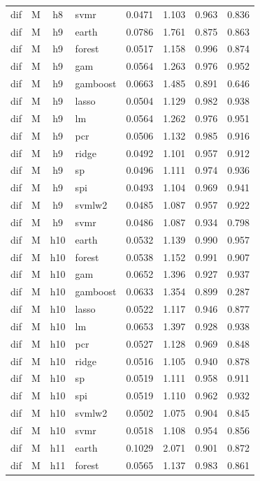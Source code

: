 \begin{ThreePartTable}
\begin{longtable}[t]{llclcccc}
dif & M & h8 & svmr & 0.0471 & 1.103 & 0.963 & 0.836\\
\addlinespace
dif & M & h9 & earth & 0.0786 & 1.761 & 0.875 & 0.863\\
dif & M & h9 & forest & 0.0517 & 1.158 & 0.996 & 0.874\\
dif & M & h9 & gam & 0.0564 & 1.263 & 0.976 & 0.952\\
dif & M & h9 & gamboost & 0.0663 & 1.485 & 0.891 & 0.646\\
dif & M & h9 & lasso & 0.0504 & 1.129 & 0.982 & 0.938\\
dif & M & h9 & lm & 0.0564 & 1.262 & 0.976 & 0.951\\
dif & M & h9 & pcr & 0.0506 & 1.132 & 0.985 & 0.916\\
dif & M & h9 & ridge & 0.0492 & 1.101 & 0.957 & 0.912\\
dif & M & h9 & sp & 0.0496 & 1.111 & 0.974 & 0.936\\
dif & M & h9 & spi & 0.0493 & 1.104 & 0.969 & 0.941\\
dif & M & h9 & svmlw2 & 0.0485 & 1.087 & 0.957 & 0.922\\
dif & M & h9 & svmr & 0.0486 & 1.087 & 0.934 & 0.798\\
\addlinespace
dif & M & h10 & earth & 0.0532 & 1.139 & 0.990 & 0.957\\
dif & M & h10 & forest & 0.0538 & 1.152 & 0.991 & 0.907\\
dif & M & h10 & gam & 0.0652 & 1.396 & 0.927 & 0.937\\
dif & M & h10 & gamboost & 0.0633 & 1.354 & 0.899 & 0.287\\
dif & M & h10 & lasso & 0.0522 & 1.117 & 0.946 & 0.877\\
dif & M & h10 & lm & 0.0653 & 1.397 & 0.928 & 0.938\\
dif & M & h10 & pcr & 0.0527 & 1.128 & 0.969 & 0.848\\
dif & M & h10 & ridge & 0.0516 & 1.105 & 0.940 & 0.878\\
dif & M & h10 & sp & 0.0519 & 1.111 & 0.958 & 0.911\\
dif & M & h10 & spi & 0.0519 & 1.110 & 0.962 & 0.932\\
dif & M & h10 & svmlw2 & 0.0502 & 1.075 & 0.904 & 0.845\\
dif & M & h10 & svmr & 0.0518 & 1.108 & 0.954 & 0.856\\
\addlinespace
dif & M & h11 & earth & 0.1029 & 2.071 & 0.901 & 0.872\\
dif & M & h11 & forest & 0.0565 & 1.137 & 0.983 & 0.861\\

\end{longtable}
\end{ThreePartTable}
